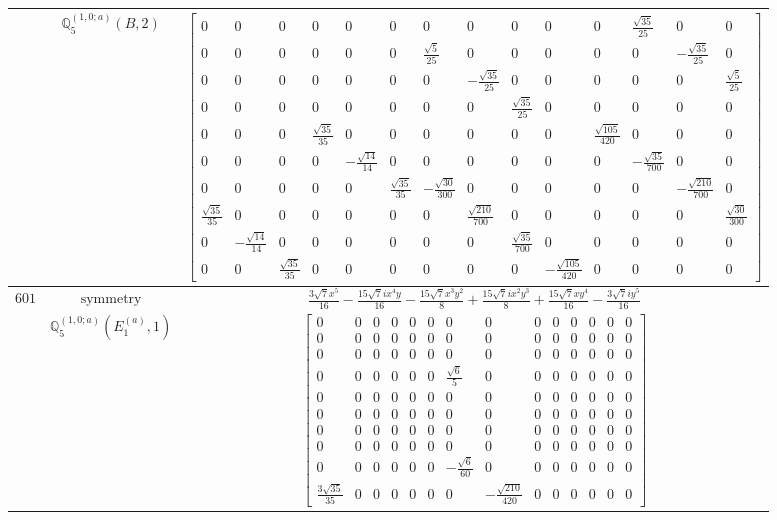 \documentclass[fleqn,8pt,landscape]{jsarticle}
\begin{document}
\begin{longtable}{ccc}
$  $ & $ \mathbb{Q}_{5}^{(1,0;a)}(B,2) $ & $ \begin{bmatrix} 0 & 0 & 0 & 0 & 0 & 0 & 0 & 0 & 0 & 0 & 0 & \frac{\sqrt{35}}{25} & 0 & 0 \\ 0 & 0 & 0 & 0 & 0 & 0 & \frac{\sqrt{5}}{25} & 0 & 0 & 0 & 0 & 0 & - \frac{\sqrt{35}}{25} & 0 \\ 0 & 0 & 0 & 0 & 0 & 0 & 0 & - \frac{\sqrt{35}}{25} & 0 & 0 & 0 & 0 & 0 & \frac{\sqrt{5}}{25} \\ 0 & 0 & 0 & 0 & 0 & 0 & 0 & 0 & \frac{\sqrt{35}}{25} & 0 & 0 & 0 & 0 & 0 \\ 0 & 0 & 0 & \frac{\sqrt{35}}{35} & 0 & 0 & 0 & 0 & 0 & 0 & \frac{\sqrt{105}}{420} & 0 & 0 & 0 \\ 0 & 0 & 0 & 0 & - \frac{\sqrt{14}}{14} & 0 & 0 & 0 & 0 & 0 & 0 & - \frac{\sqrt{35}}{700} & 0 & 0 \\ 0 & 0 & 0 & 0 & 0 & \frac{\sqrt{35}}{35} & - \frac{\sqrt{30}}{300} & 0 & 0 & 0 & 0 & 0 & - \frac{\sqrt{210}}{700} & 0 \\ \frac{\sqrt{35}}{35} & 0 & 0 & 0 & 0 & 0 & 0 & \frac{\sqrt{210}}{700} & 0 & 0 & 0 & 0 & 0 & \frac{\sqrt{30}}{300} \\ 0 & - \frac{\sqrt{14}}{14} & 0 & 0 & 0 & 0 & 0 & 0 & \frac{\sqrt{35}}{700} & 0 & 0 & 0 & 0 & 0 \\ 0 & 0 & \frac{\sqrt{35}}{35} & 0 & 0 & 0 & 0 & 0 & 0 & - \frac{\sqrt{105}}{420} & 0 & 0 & 0 & 0 \end{bmatrix} $ \\ \hline
$ 601 $ & $ \text{symmetry} $ & $ \frac{3 \sqrt{7} x^{5}}{16} - \frac{15 \sqrt{7} i x^{4} y}{16} - \frac{15 \sqrt{7} x^{3} y^{2}}{8} + \frac{15 \sqrt{7} i x^{2} y^{3}}{8} + \frac{15 \sqrt{7} x y^{4}}{16} - \frac{3 \sqrt{7} i y^{5}}{16} $ \\
$  $ & $ \mathbb{Q}_{5}^{(1,0;a)}(E_{1}^{(a)},1) $ & $ \begin{bmatrix} 0 & 0 & 0 & 0 & 0 & 0 & 0 & 0 & 0 & 0 & 0 & 0 & 0 & 0 \\ 0 & 0 & 0 & 0 & 0 & 0 & 0 & 0 & 0 & 0 & 0 & 0 & 0 & 0 \\ 0 & 0 & 0 & 0 & 0 & 0 & 0 & 0 & 0 & 0 & 0 & 0 & 0 & 0 \\ 0 & 0 & 0 & 0 & 0 & 0 & \frac{\sqrt{6}}{5} & 0 & 0 & 0 & 0 & 0 & 0 & 0 \\ 0 & 0 & 0 & 0 & 0 & 0 & 0 & 0 & 0 & 0 & 0 & 0 & 0 & 0 \\ 0 & 0 & 0 & 0 & 0 & 0 & 0 & 0 & 0 & 0 & 0 & 0 & 0 & 0 \\ 0 & 0 & 0 & 0 & 0 & 0 & 0 & 0 & 0 & 0 & 0 & 0 & 0 & 0 \\ 0 & 0 & 0 & 0 & 0 & 0 & 0 & 0 & 0 & 0 & 0 & 0 & 0 & 0 \\ 0 & 0 & 0 & 0 & 0 & 0 & - \frac{\sqrt{6}}{60} & 0 & 0 & 0 & 0 & 0 & 0 & 0 \\ \frac{3 \sqrt{35}}{35} & 0 & 0 & 0 & 0 & 0 & 0 & - \frac{\sqrt{210}}{420} & 0 & 0 & 0 & 0 & 0 & 0 \end{bmatrix} $ \\ \hline

\end{longtable}
\end{document}
